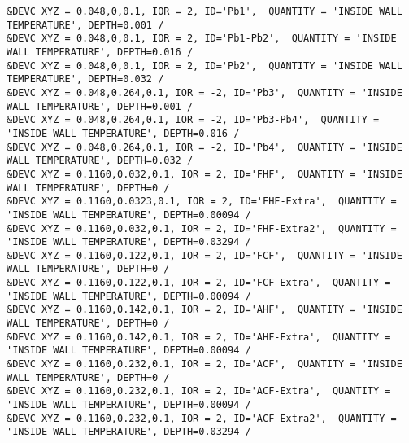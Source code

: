 \begin{lstlisting}
&DEVC XYZ = 0.048,0,0.1, IOR = 2, ID='Pb1',  QUANTITY = 'INSIDE WALL TEMPERATURE', DEPTH=0.001 /
&DEVC XYZ = 0.048,0,0.1, IOR = 2, ID='Pb1-Pb2',  QUANTITY = 'INSIDE WALL TEMPERATURE', DEPTH=0.016 /
&DEVC XYZ = 0.048,0,0.1, IOR = 2, ID='Pb2',  QUANTITY = 'INSIDE WALL TEMPERATURE', DEPTH=0.032 /
&DEVC XYZ = 0.048,0.264,0.1, IOR = -2, ID='Pb3',  QUANTITY = 'INSIDE WALL TEMPERATURE', DEPTH=0.001 /
&DEVC XYZ = 0.048,0.264,0.1, IOR = -2, ID='Pb3-Pb4',  QUANTITY = 'INSIDE WALL TEMPERATURE', DEPTH=0.016 /
&DEVC XYZ = 0.048,0.264,0.1, IOR = -2, ID='Pb4',  QUANTITY = 'INSIDE WALL TEMPERATURE', DEPTH=0.032 /
&DEVC XYZ = 0.1160,0.032,0.1, IOR = 2, ID='FHF',  QUANTITY = 'INSIDE WALL TEMPERATURE', DEPTH=0 /
&DEVC XYZ = 0.1160,0.0323,0.1, IOR = 2, ID='FHF-Extra',  QUANTITY = 'INSIDE WALL TEMPERATURE', DEPTH=0.00094 /
&DEVC XYZ = 0.1160,0.032,0.1, IOR = 2, ID='FHF-Extra2',  QUANTITY = 'INSIDE WALL TEMPERATURE', DEPTH=0.03294 /
&DEVC XYZ = 0.1160,0.122,0.1, IOR = 2, ID='FCF',  QUANTITY = 'INSIDE WALL TEMPERATURE', DEPTH=0 /
&DEVC XYZ = 0.1160,0.122,0.1, IOR = 2, ID='FCF-Extra',  QUANTITY = 'INSIDE WALL TEMPERATURE', DEPTH=0.00094 /
&DEVC XYZ = 0.1160,0.142,0.1, IOR = 2, ID='AHF',  QUANTITY = 'INSIDE WALL TEMPERATURE', DEPTH=0 /
&DEVC XYZ = 0.1160,0.142,0.1, IOR = 2, ID='AHF-Extra',  QUANTITY = 'INSIDE WALL TEMPERATURE', DEPTH=0.00094 /
&DEVC XYZ = 0.1160,0.232,0.1, IOR = 2, ID='ACF',  QUANTITY = 'INSIDE WALL TEMPERATURE', DEPTH=0 /
&DEVC XYZ = 0.1160,0.232,0.1, IOR = 2, ID='ACF-Extra',  QUANTITY = 'INSIDE WALL TEMPERATURE', DEPTH=0.00094 /
&DEVC XYZ = 0.1160,0.232,0.1, IOR = 2, ID='ACF-Extra2',  QUANTITY = 'INSIDE WALL TEMPERATURE', DEPTH=0.03294 /


\end{lstlisting}
